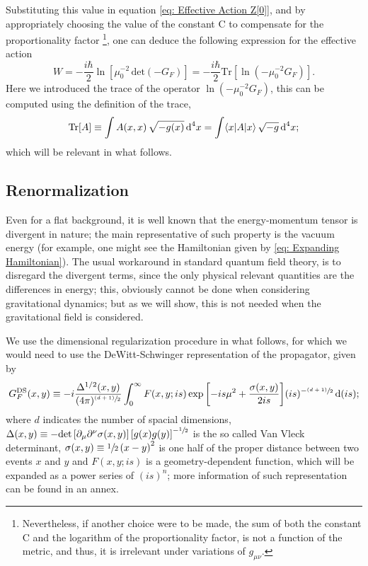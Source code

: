 Substituting this value in equation \ref{eq: Effective Action Z[0]}, and by appropriately choosing the value of the constant C to compensate for the proportionality factor \footnote{Nevertheless, if another choice were to be made, the sum of both the constant C and the logarithm of the proportionality factor, is not a function of the metric, and thus, it is irrelevant under variations of $g_{\mu\nu}$.}, one can deduce the following expression for the effective action
\begin{equation}\label{eq: Effective action W propagator}
	W=-\frac{i\hbar}{2}\ln\left[\mu_0^{-2} \,\text{det}\left(-G_F\right)\right]=-\frac{i\hbar}{2}\text{Tr}\left[\ln\left(-\mu_0^{-2}G_F\right)\right].
\end{equation}
Here we introduced the trace of the operator $\ln\left(-\mu_0^{-2}G_F\right)$, this can be computed using the definition of the trace,
\begin{equation}\label{eq: Trace definition}
	\text{Tr}[A]\equiv \int A(x,x)\,\sqrt{-g(x)}\,\text{d}^4x=\int \langle x|A|x\rangle\,\sqrt{-g}\,\text{d}^4x;
\end{equation}
which will be relevant in what follows.
\subsection{Renormalization}
Even for a flat background, it is well known that the energy-momentum tensor is divergent in nature; the main representative of such property is the vacuum energy (for example, one might see the Hamiltonian given by \ref{eq: Expanding Hamiltonian}). The usual workaround in standard quantum field theory, is to disregard the divergent terms, since the only physical relevant quantities are the differences in energy; this, obviously cannot be done when considering gravitational dynamics; but as we will show, this is not needed when the gravitational field is considered. 

We use the dimensional regularization procedure in what follows, for which we would need to use the DeWitt-Schwinger representation of the propagator, given by
\begin{equation}
	G_F^{\text{DS}}(x,y)\equiv -i\frac{\Delta^{1/2}(x,y)}{(4\pi)^{\sfrac{(d+1)}{2}}}\int^\infty_0F(x,y;is)\exp{\left[-is\mu^2+\frac{\sigma(x,y)}{2is}\right]}(is)^{-\sfrac{(d+1)}{2}}\,\text{d} (is);
\end{equation}
where $d$ indicates the number of spacial dimensions, $\Delta(x,y)\equiv -\text{det}\left[\partial_\mu\partial^\nu\sigma(x,y)\right]\left[g(x)g(y)\right]^{-\sfrac{1}{2}}$ is the so called Van Vleck determinant, $\sigma(x,y)\equiv\sfrac{1}{2}\left(x-y\right)^2$ is one half of the proper distance between two events $x$ and $y$ and $F(x,y;is)$ is a geometry-dependent function, which will be expanded as a power series of $(is)^n$; more information of such representation can be found in an annex.

